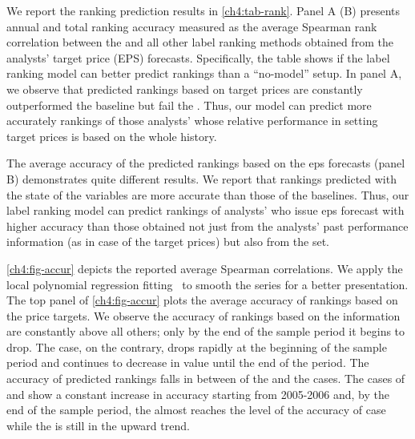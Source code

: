 \documentclass[a4paper,twoside,12pt,openright,notitlepage]{report}\usepackage[]{graphicx}\usepackage[]{color}
\begin{document}
We report the ranking prediction results in \ref{ch4:tab-rank}. Panel A (B)  presents annual and total ranking accuracy measured as the average Spearman rank correlation between the \true{} and all other label ranking methods obtained from the analysts' target price (EPS) forecasts. Specifically, the table shows  if the label ranking model can better predict rankings than a ``no-model'' setup.  In panel A, we observe that  predicted rankings based on target prices are constantly outperformed the  baseline but fail  the  \naive{}. Thus, our model can predict more accurately rankings of those analysts' whose  relative performance in setting target prices is based on the whole history.

The average accuracy of the predicted rankings based on the \gls{eps} forecasts (panel B) demonstrates quite different results. We report that rankings predicted  with the \diff{} state of the variables are more accurate  than those of the baselines. Thus, our label ranking model can predict rankings of analysts' who issue \gls{eps} forecast with higher accuracy than those obtained not just from  the  analysts' past performance information (as in case of the target prices) but also from the \naive{} set.

\ref{ch4:fig-accur} depicts the reported average Spearman correlations. We apply the local polynomial regression fitting~\citep{cleveland1992} to smooth the series for a better presentation. The top panel of \ref{ch4:fig-accur} plots the average accuracy of rankings based on the price targets. We observe the accuracy of rankings based on the \naive{} information are constantly above all others; only by the end of the sample period it begins to drop. The  case, on the contrary, drops rapidly at the beginning of the sample period and continues to decrease in value until the end of the period. The accuracy of predicted rankings falls in between of the \naive{} and the  cases. The cases of \diff{} and \random{} show a constant increase in accuracy starting from 2005-2006  and, by the end of the sample period, the \random{} almost reaches the level of the accuracy of \naive{} case while the \diff{} is still in the upward trend.
\end{document}
